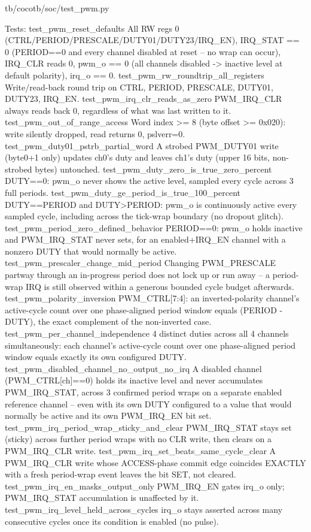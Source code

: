 \begin{relocated}{tb/cocotb/soc/test_pwm.py}
\begin{textblock}
Tests:
test_pwm_reset_defaults
All RW regs 0 (CTRL/PERIOD/PRESCALE/DUTY01/DUTY23/IRQ_EN), IRQ_STAT == 0 (PERIOD==0 and
every channel disabled at reset -- no wrap can occur), IRQ_CLR reads 0, pwm_o == 0 (all
channels disabled -> inactive level at default polarity), irq_o == 0.
test_pwm_rw_roundtrip_all_registers
Write/read-back round trip on CTRL, PERIOD, PRESCALE, DUTY01, DUTY23, IRQ_EN.
test_pwm_irq_clr_reads_as_zero
PWM_IRQ_CLR always reads back 0, regardless of what was last written to it.
test_pwm_out_of_range_access
Word index >= 8 (byte offset >= 0x020): write silently dropped, read returns 0, pslverr=0.
test_pwm_duty01_pstrb_partial_word
A strobed PWM_DUTY01 write (byte0+1 only) updates ch0's duty and leaves ch1's duty (upper
16 bits, non-strobed bytes) untouched.
test_pwm_duty_zero_is_true_zero_percent
DUTY==0: pwm_o never shows the active level, sampled every cycle across 3 full periods.
test_pwm_duty_ge_period_is_true_100_percent
DUTY==PERIOD and DUTY>PERIOD: pwm_o is continuously active every sampled cycle, including
across the tick-wrap boundary (no dropout glitch).
test_pwm_period_zero_defined_behavior
PERIOD==0: pwm_o holds inactive and PWM_IRQ_STAT never sets, for an enabled+IRQ_EN channel
with a nonzero DUTY that would normally be active.
test_pwm_prescaler_change_mid_period
Changing PWM_PRESCALE partway through an in-progress period does not lock up or run away --
a period-wrap IRQ is still observed within a generous bounded cycle budget afterwards.
test_pwm_polarity_inversion
PWM_CTRL[7:4]: an inverted-polarity channel's active-cycle count over one phase-aligned
period window equals (PERIOD - DUTY), the exact complement of the non-inverted case.
test_pwm_per_channel_independence
4 distinct duties across all 4 channels simultaneously: each channel's active-cycle count
over one phase-aligned period window equals exactly its own configured DUTY.
test_pwm_disabled_channel_no_output_no_irq
A disabled channel (PWM_CTRL[ch]==0) holds its inactive level and never accumulates
PWM_IRQ_STAT, across 3 confirmed period wraps on a separate enabled reference channel --
even with its own DUTY configured to a value that would normally be active and its own
PWM_IRQ_EN bit set.
test_pwm_irq_period_wrap_sticky_and_clear
PWM_IRQ_STAT stays set (sticky) across further period wraps with no CLR write, then clears
on a PWM_IRQ_CLR write.
test_pwm_irq_set_beats_same_cycle_clear
A PWM_IRQ_CLR write whose ACCESS-phase commit edge coincides EXACTLY with a fresh
period-wrap event leaves the bit SET, not cleared.
test_pwm_irq_en_masks_output_only
PWM_IRQ_EN gates irq_o only; PWM_IRQ_STAT accumulation is unaffected by it.
test_pwm_irq_level_held_across_cycles
irq_o stays asserted across many consecutive cycles once its condition is enabled (no pulse).
\end{textblock}

\end{relocated}

